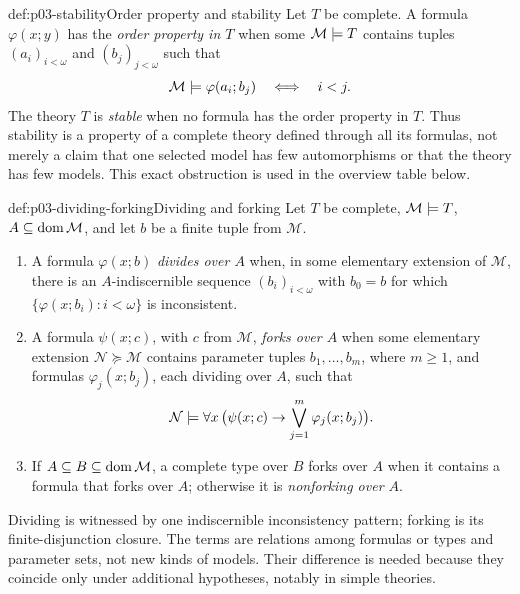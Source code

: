 \begin{hbdefinition}{def:p03-stability}{Order property and stability}
Let \(T\) be complete.  A formula \(\varphi(x;y)\) has the \emph{order
property in \(T\)} when some \(\mathcal M\models T\) contains tuples
\((a_i)_{i<\omega}\) and \((b_j)_{j<\omega}\) such that
\[
 \mathcal M\models\varphi(a_i;b_j)
 \quad\Longleftrightarrow\quad i<j.
\]
The theory \(T\) is \emph{stable} when no formula has the order property in
\(T\).  Thus stability is a property of a complete theory defined through
all its formulas, not merely a claim that one selected model has few
automorphisms or that the theory has few models.  This exact obstruction is
used in the overview table below.
\end{hbdefinition}

\begin{hbdefinition}{def:p03-dividing-forking}{Dividing and forking}
Let \(T\) be complete, \(\mathcal M\models T\), \(A\subseteq\operatorname{dom}\mathcal M\),
and let \(b\) be a finite tuple from \(\mathcal M\).
\begin{enumerate}
  \item A formula \(\varphi(x;b)\) \emph{divides over \(A\)} when, in some
        elementary extension of \(\mathcal M\), there is an
        \(A\)-indiscernible sequence \((b_i)_{i<\omega}\) with \(b_0=b\)
        for which \(\{\varphi(x;b_i):i<\omega\}\) is inconsistent.
  \item A formula \(\psi(x;c)\), with \(c\) from \(\mathcal M\),
        \emph{forks over \(A\)} when some elementary extension
        \(\mathcal N\succcurlyeq\mathcal M\) contains parameter tuples
        \(b_1,\ldots,b_m\), where \(m\geq1\), and formulas
        \(\varphi_j(x;b_j)\), each dividing
        over \(A\), such that
        \[
          \mathcal N\models\forall x\,
          \bigl(\psi(x;c)\to\bigvee_{j=1}^{m}\varphi_j(x;b_j)\bigr).
        \]
  \item If \(A\subseteq B\subseteq\operatorname{dom}\mathcal M\), a complete type over
        \(B\) forks over \(A\) when it contains a formula that forks over
        \(A\); otherwise it is \emph{nonforking over \(A\)}.
\end{enumerate}
Dividing is witnessed by one indiscernible inconsistency pattern; forking is
its finite-disjunction closure.  The terms are relations among formulas or
types and parameter sets, not new kinds of models.  Their difference is
needed because they coincide only under additional hypotheses, notably in
simple theories.
\end{hbdefinition}

